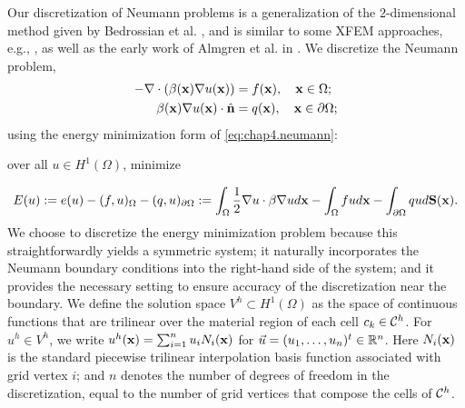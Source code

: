 Our discretization of Neumann problems is a generalization of the $2$-dimensional method given by Bedrossian et al. \cite{Bedrossian10}, and is similar to some XFEM approaches, e.g., \cite{Daux00}, as well as the early work of Almgren et al. in \cite{Almgren97}. We discretize the Neumann problem,
\begin{equation} \label{eq:chap4.neumann}
\begin{split}
-\nabla \cdot \left( \beta(\mathbf{x}) \nabla u(\mathbf{x}) \right) & = f(\mathbf{x}), \quad \mathbf{x} \in \Omega; \\
\beta(\mathbf{x}) \nabla u(\mathbf{x}) \cdot \hat{\mathbf{n}} & = q(\mathbf{x}), \quad \mathbf{x} \in \partial\Omega;
\end{split}
\end{equation}
using the energy minimization form of \eqref{eq:chap4.neumann}:
\begin{center}
over all $u \in H^1(\Omega)$, minimize
\end{center}
\begin{equation} \label{eq:chap4.neumann.energy.continuous}
E(u) := e(u) - (f,u)_{\Omega} - (q,u)_{\partial\Omega} := \int_{\Omega} \frac{1}{2} \nabla u \cdot \beta \nabla u d\mathbf{x} - \int_{\Omega} f u d\mathbf{x} - \int_{\partial\Omega} q u d\mathbf{S}(\mathbf{x}).
\end{equation}
We choose to discretize the energy minimization problem because this straightforwardly yields a symmetric system; it naturally incorporates the Neumann boundary conditions into the right-hand side of the system; and it provides the necessary setting to ensure accuracy of the discretization near the boundary. We define the solution space $V^h \subset H^1(\Omega)$ as the space of continuous functions that are trilinear over the material region of each cell $c_k \in \mathcal{C}^h$. For $u^h \in V^h$, we write $u^h(\mathbf{x}) = \sum_{i = 1}^n u_i N_i(\mathbf{x})$ for $\vec{u} = (u_1, \dotsc, u_n)^t \in \mathbb{R}^n$. Here $N_i(\mathbf{x})$ is the standard piecewise trilinear interpolation basis function associated with grid vertex $i$; and $n$ denotes the number of degrees of freedom in the discretization, equal to the number of grid vertices that compose the cells of $\mathcal{C}^h$.

